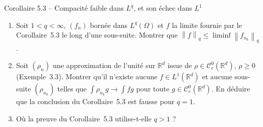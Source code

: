 \documentclass[11pt,a4paper]{article}
\newcommand{\R}{\mathbb{R}}
\newcommand{\norm}[1]{\left\|#1\right\|}
\newcommand{\Cc}{\mathcal{C}^0_c}
\theoremstyle{definition}
\begin{document}
\begin{exo}{Corollaire 5.3 -- Compacité faible dans $L^q$, et son échec dans $L^1$}
\begin{enumerate}[label=(\alph*)]
  \item Soit $1<q<\infty$, $(f_n)$ bornée dans $L^q(\Omega)$ et $f$ la limite fournie par le Corollaire~5.3 le long d'une sous-suite. Montrer que $\norm f_q\le\liminf\norm{f_{n_k}}_q$.
  \item Soit $(\rho_n)$ une approximation de l'unité sur $\R^d$ issue de $\rho\in\Cc(\R^d)$, $\rho\ge0$ (Exemple~3.3). Montrer qu'il n'existe aucune $f\in L^1(\R^d)$ et aucune sous-suite $(\rho_{n_k})$ telles que $\int\rho_{n_k}g\to\int fg$ pour toute $g\in\Cc(\R^d)$. En déduire que la conclusion du Corollaire~5.3 est fausse pour $q=1$.
  \item Où la preuve du Corollaire~5.3 utilise-t-elle $q>1$ ?
\end{enumerate}
\end{exo}
\end{document}
